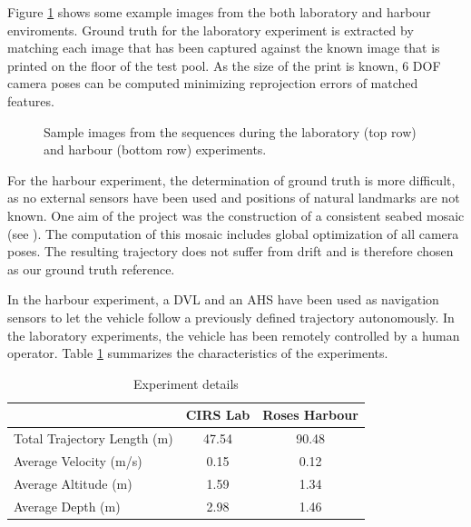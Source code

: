 \documentclass[conference]{IEEEtran}
\begin{document}

Figure \ref{sample-images} shows some example images from the both laboratory and harbour enviroments. Ground truth for the laboratory experiment is extracted by matching each image that has been captured against the known image that is printed on the floor of the test pool. As the size of the print is known, 6 DOF camera poses can be computed minimizing reprojection errors of matched features.

\begin{figure}
  \noindent{}
  \caption{Sample images from the sequences during the laboratory (top row) and harbour (bottom row) experiments.}
  \label{sample-images}
\end{figure}

For the harbour experiment, the determination of ground truth is more difficult, as no external sensors have been used and positions of natural landmarks are not known. One aim of the project was the construction of a consistent seabed mosaic (see \cite{Ferrer2007}). The computation of this mosaic includes global optimization of all camera poses. The resulting trajectory does not suffer from drift and is therefore chosen as our ground truth reference.

In the harbour experiment, a DVL and an AHS have been used as navigation sensors to let the vehicle follow a previously defined trajectory autonomously. In the laboratory experiments, the vehicle has been remotely controlled by a human operator. Table \ref{experiment-details} summarizes the characteristics of the experiments.

\begin{table}[!t]
  \renewcommand{\arraystretch}{1.3}
  \caption{Experiment details}
  \label{experiment-details}
  \centering
  \begin{tabular}{lcc}
    & \textbf{CIRS Lab} & \textbf{Roses Harbour}  \\ \hline
    Total Trajectory Length (m)     & 47.54 & 90.48  \\
    Average Velocity (m/s)          & 0.15 & 0.12  \\
    Average Altitude (m)            & 1.59 & 1.34  \\
    Average Depth (m)               & 2.98 & 1.46  \\
  \end{tabular}
\end{table}
\end{document}
